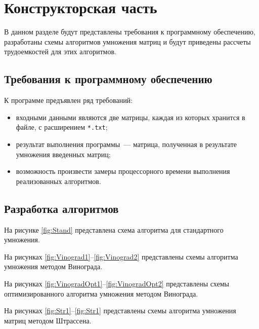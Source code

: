 \chapter{Конструкторская часть}
В данном разделе будут представлены требования к программному обеспечению, разработаны схемы алгоритмов умножения матриц и будут приведены рассчеты трудоемкостей для этих алгоритмов.

\section{Требования к программному обеспечению}
К программе предъявлен ряд требований:
\begin{itemize}
    \item входными данными являются две матрицы, каждая из которых хранится в файле, с расширением \texttt{*.txt};
    \item результат выполнения программы~--- матрица, полученная в результате умножения введенных матриц;
    \item возможность произвести замеры процессорного времени выполнения реализованных алгоритмов.
\end{itemize}

\section{Разработка алгоритмов}
На рисунке \ref{fig:Stand} представлена схема алгоритма для стандартного умножения.

На рисунках \ref{fig:Vinograd1}--\ref{fig:Vinograd2} представлены схемы алгоритма умножения методом Винограда.

На рисунках \ref{fig:VinogradOpt1}--\ref{fig:VinogradOpt2} представлены схемы оптимизированного алгоритма умножения методом Винограда.

На рисунках \ref{fig:Str1}--\ref{fig:Str1} представлены схемы алгоритма умножения матриц методом Штрассена.

